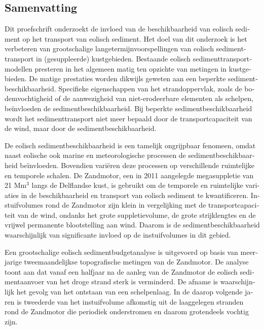 \begin{otherlanguage}{dutch}
\chapter*{Samenvatting}
Dit proefschrift onderzoekt de invloed van de beschikbaarheid van
eolisch sediment op het transport van eolisch sediment. Het doel van
dit onderzoek is het verbeteren van grootschalige
langetermijnvoorspellingen van eolisch sedimenttransport in
(gesuppleerde) kustgebieden. Bestaande eolisch
sedimenttransportmodellen presteren in het algemeen matig ten opzichte
van metingen in kustgebieden. De matige prestaties worden dikwijls
geweten aan een beperkte sedimentbeschikbaarheid. Specifieke
eigenschappen van het strandoppervlak, zoals de bodemvochtigheid of de
aanwezigheid van niet-erodeerbare elementen als schelpen,
be{\"i}nvloeden de sedimentbeschikbaarheid. Bij beperkte
sedimentbeschikbaarheid wordt het sedimenttransport niet meer bepaald
door de transportcapaciteit van de wind, maar door de
sedimentbeschikbaarheid.

De eolisch sedimentbeschikbaarheid is een tamelijk ongrijpbaar
fenomeen, omdat naast eolische ook marine en meteorologische processen
de sedimentbeschikbaarheid be{\"i}nvloeden. Bovendien vari{\"e}ren
deze processen op verschillende ruimtelijke en temporele schalen. De
Zandmotor, een in 2011 aangelegde megasuppletie van 21 $\mathrm{Mm^3}$
langs de Delflandse kust, is gebruikt om de temporele en ruimtelijke
variaties in de beschikbaarheid en transport van eolisch sediment te
kwantificeren. Instuifvolumes rond de Zandmotor zijn klein in
vergelijking met de transportcapaciteit van de wind, ondanks het grote
suppletievolume, de grote strijklengtes en de vrijwel permanente
blootstelling aan wind. Daarom is de sedimentbeschikbaarheid
waarschijnlijk van significante invloed op de instuifvolumes in dit
gebied.

Een grootschalige eolisch sedimentbudgetanalyse is uitgevoerd op basis
van meerjarige tweemaandelijkse topografische metingen van de
Zandmotor. De analyse toont aan dat vanaf een halfjaar na de aanleg
van de Zandmotor de eolisch sedimentaanvoer van het droge strand sterk
is verminderd. De afname is waarschijnlijk het gevolg van het ontstaan
van een schelpenlaag. In de daarop volgende jaren is tweederde van het
instuifvolume afkomstig uit de laaggelegen stranden rond de Zandmotor
die periodiek onderstromen en daarom grotendeels vochtig zijn.


\end{otherlanguage}
